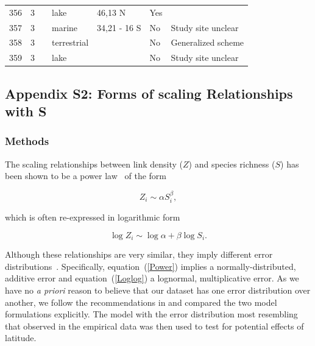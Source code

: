 \documentclass[12pt]{article}
\begin{document}
\begin{landscape}
\begin{table}[h!]
{\begin{tabular}{p{2.8cm}p{1.3cm}p{5.5cm}p{2.2cm}p{2.5cm}lp{3.5cm}}
        356   & 3 & \citet{Cohen2003}    & lake  & 46,13 N & Yes   &       \\
        357   & 3 & \citet{Yodzis1998} & marine & 34,21 - 16 S & No    & Study site unclear \\
        358   & 3 & \citet{Schroter2003}  & terrestrial &       & No    & Generalized scheme \\
        359   & 3 & \citet{Baiser2012}  & lake  &       & No    & Study site unclear \\
        \hline
      \end{tabular}%
        }
    \end{table}%

  \end{landscape}
\newpage

\subsection*{Appendix S2: Forms of scaling Relationships with S}

  \subsubsection*{Methods}

    The scaling relationships between link density ($Z$) and species richness ($S$)
    has been shown to be a power law~\citep{Riede2010} of the form 

    \begin{equation}
    \label{Power}
    Z_{i} \sim \alpha S_{i}^{\beta}  ,
    \end{equation}

    \noindent which is often re-expressed in logarithmic form 

    \begin{equation}
    \label{Loglog}
    \log{Z_{i}} \sim \log{\alpha} + \beta\log{S_{i}}  .
    \end{equation}

    \noindent Although these relationships are very similar, they imply different error distributions~\citep{Xiao2011}.
    Specifically, equation~(\ref{Power}) implies a normally-distributed, additive error and equation~(\ref{Loglog}) a lognormal,
    multiplicative error. As we have no \emph{a priori} reason to believe that our dataset has one error distribution
    over another, we follow the recommendations in\citet{Xiao2011} and compared the two
    model formulations explicitly. The model with the error distribution most resembling that observed in the empirical
    data was then used to test for potential effects of latitude.
\end{document}
